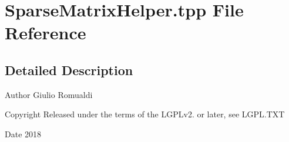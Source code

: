 \section{Sparse\+Matrix\+Helper.\+tpp File Reference}
\label{SparseMatrixHelper_8tpp}


\subsection{Detailed Description}
\begin{DoxyAuthor}{Author}
Giulio Romualdi 
\end{DoxyAuthor}
\begin{DoxyCopyright}{Copyright}
Released under the terms of the L\+G\+P\+Lv2. or later, see L\+G\+P\+L.\+T\+XT 
\end{DoxyCopyright}
\begin{DoxyDate}{Date}
2018 
\end{DoxyDate}
